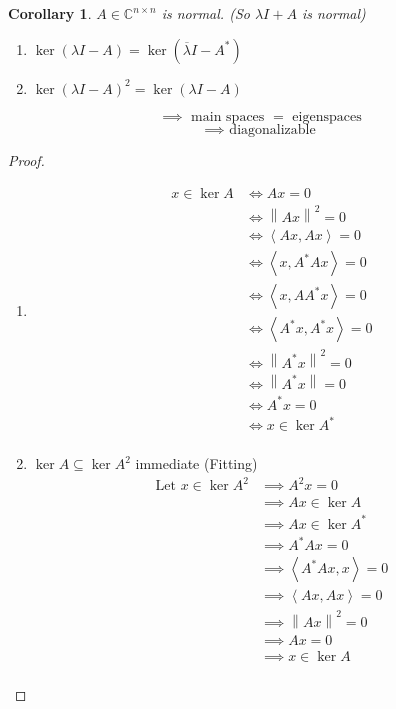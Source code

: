 \documentclass{article}
\newcounter{lecref}[section]
\numberwithin{lecref}{section}
\newtheorem{corollary}[lecref]{Corollary}
\newcommand{\angel}[1]{\left\langle#1\right\rangle}
\newcommand{\norm}[1]{\left\|#1\right\|}
\begin{document}
\begin{corollary} %
  \label{cor125}
  $A \in \mathbb C^{n \times n}$ is normal. (So $\lambda I + A$ is normal)
  \begin{enumerate}
    \item $\ker(\lambda I - A) = \ker(\overline{\lambda} I - A^*)$
    \item $\ker(\lambda I - A)^2 = \ker(\lambda I - A)$
  \end{enumerate}
  \[ \implies \text{ main spaces } = \text{ eigenspaces} \]
  \[ \implies \text{ diagonalizable} \]
\end{corollary}

\begin{proof}
  \begin{enumerate}
    \item
      \begin{align*}
        x \in \ker{A} &\iff Ax = 0 \\
          &\iff \norm{Ax}^2 = 0 \\
          &\iff \angel{Ax, Ax} = 0 \\
          &\iff \angel{x, A^* Ax} = 0 \\
          &\iff \angel{x, AA^* x} = 0 \\
          &\iff \angel{A^* x, A^* x} = 0 \\
          &\iff \norm{A^* x}^2 = 0 \\
          &\iff \norm{A^* x} = 0 \\
          &\iff A^* x = 0 \\
          &\iff x \in \ker{A^*} \\
      \end{align*}
    \item $\ker{A} \subseteq \ker{A^2}$ immediate (Fitting)
      \begin{align*}
        \text{Let } x \in \ker{A^2}
          &\implies A^2 x = 0 \\
          &\implies Ax \in \ker{A} \\
          &\implies Ax \in \ker{A^*} \\
          &\implies A^* Ax = 0 \\
          &\implies \angel{A^* Ax, x} = 0 \\
          &\implies \angel{Ax, Ax} = 0 \\
          &\implies \norm{Ax}^2 = 0 \\
          &\implies Ax = 0 \\
          &\implies x \in \ker{A} \\
      \end{align*}
  \end{enumerate}
\end{proof}
\end{document}
